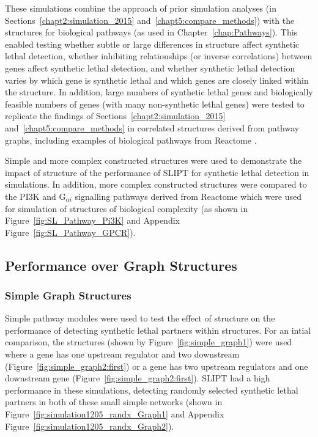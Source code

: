 These simulations combine the approach of prior simulation analyses (in Sections~\ref{chapt2:simulation_2015} and~\ref{chapt5:compare_methods}) with the  structures for biological pathways (as used in Chapter~\ref{chap:Pathways}). This enabled testing whether subtle or large differences in  structure affect \gls{synthetic lethal} detection, whether inhibiting relationships (or inverse correlations) between genes affect \gls{synthetic lethal} detection, and whether \gls{synthetic lethal} detection varies by which gene is \gls{synthetic lethal} and which genes are closely linked within the  structure. In addition, large numbers of \gls{synthetic lethal} genes and biologically feasible numbers of genes (with many non-synthetic lethal genes) were tested to replicate the findings of Sections~\ref{chapt2:simulation_2015} and~\ref{chapt5:compare_methods} in correlated structures derived from pathway graphs, including examples of biological pathways from Reactome \citep{Reactome}.

Simple and more complex constructed  structures were used to demonstrate the impact of  structure of the performance of \gls{SLIPT} for \gls{synthetic lethal} detection in simulations. In addition, more complex constructed  structures were compared to the \gls{PI3K} and G$_{\alpha i}$ signalling pathways derived from Reactome which were used for simulation of  structures of biological complexity (as shown in Figure~\ref{fig:SL_Pathway_Pi3K} and Appendix Figure~\ref{fig:SL_Pathway_GPCR}).

\FloatBarrier

\subsection{Performance over Graph Structures}
\label{chapt5:graphsim_performance}

\subsubsection{Simple Graph Structures}
\label{chapt5:graphsim_performance_simple}

\FloatBarrier

Simple pathway modules were used to test the effect of  structure on the performance of detecting \gls{synthetic lethal} partners within  structures. For an intial comparison, the  structures (shown by Figure~\ref{fig:simple_graph1}) were used where a gene has one upstream regulator and two downstream (Figure~\ref{fig:simple_graph2:first}) or a gene has two upstream regulators and one downstream gene (Figure~\ref{fig:simple_graph2:first}). \gls{SLIPT} had a high performance in these simulations, detecting randomly selected \gls{synthetic lethal} partners in both of these small simple networks (shown in Figure~\ref{fig:simulation1205_randx_Graph1} and Appendix Figure~\ref{fig:simulation1205_randx_Graph2}). 


